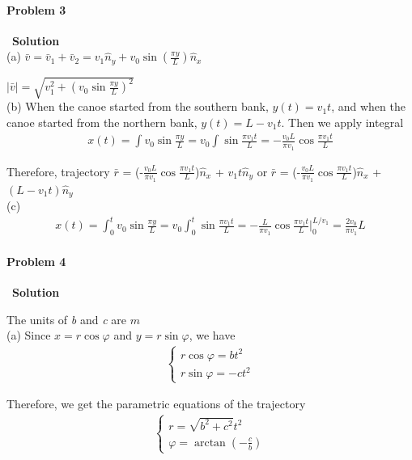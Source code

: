 \documentclass[12pt,a4paper]{article}
\begin{document}
\paragraph{\large \textbf{Problem 3}}~{\textbf{Solution}}
\vspace{2mm}\\
\noindent (a) $\bar{v} = \bar{v}_1 + \bar{v}_2 = v_1\hat{n}_y + v_0\sin(\frac{\pi y}{L})\hat{n}_x$
\par $|\bar{v}| = \sqrt{v_1^2 + (v_0\sin\frac{\pi y}{L})^2}$\\
\noindent (b) When the canoe started from the southern bank, $y(t) = v_1t$, and when the canoe started from the northern bank, $y(t) = L-v_1t$. Then we apply integral
\begin{align*}
	x(t) = \int v_0\sin\frac{\pi y}{L} = v_0\int \sin\frac{\pi v_1 t}{L} = -\frac{v_0L}{\pi v_1}\cos\frac{\pi v_1t}{L}
\end{align*}
\par Therefore, trajectory $\bar{r}$ = (-$\frac{v_0L}{\pi v_1}\cos\frac{\pi v_1t}{L}$)$\hat{n}_x$ + $v_1t \hat{n}_y$ or $\bar{r}$ = (-$\frac{v_0L}{\pi v_1}\cos\frac{\pi v_1t}{L}$)$\hat{n}_x$ + $(L-v_1t) \hat{n}_y$\\
\noindent (c)
\begin{align*}
	x(t) = \int_0^t v_0\sin\frac{\pi y}{L} = v_0\int_0^t \sin\frac{\pi v_1 t}{L} = -\frac{L}{\pi v_1}\cos\frac{\pi v_1t}{L}|_0^{L/v_1} = \frac{2v_0}{\pi v_1}L
\end{align*}

\paragraph{\large \textbf{Problem 4}}~{\textbf{Solution}}
\vspace{2mm}
\par The units of \textit{b} and \textit{c} are $m$\\
\noindent (a) Since $x = r\cos\varphi$ and $y = r\sin\varphi$, we have
\begin{align*}
	\left\{ \begin{array}{c}
	r\cos\varphi = bt^2\\
	r\sin\varphi = -ct^2
	\end{array}	\right.
\end{align*}
\par Therefore, we get the parametric equations of the trajectory
\begin{align*}
	\left\{ \begin{array}{c}
	r = \sqrt{b^2+c^2} t^2\\
	\varphi = \arctan(-\frac{c}{b})
	\end{array}	\right.
\end{align*}
\end{document}
